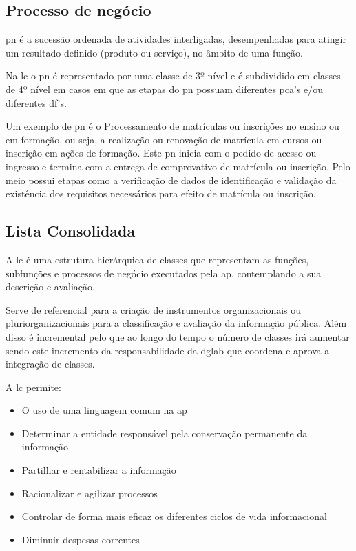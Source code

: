 \subsection{Processo de negócio}
\acrfull{pn} é a sucessão ordenada de atividades interligadas, desempenhadas para atingir um resultado definido (produto ou serviço), no âmbito de uma função.~\cite{procNeg}

Na \acrshort{lc} o \acrshort{pn} é representado por uma classe de 3º nível e é subdividido em classes de 4º nível em casos em que as etapas do \acrlong{pn} possuam diferentes \acrshort{pca}'s e/ou diferentes \acrshort{df}'s.

Um exemplo de \acrshort{pn} é o Processamento de matrículas ou inscrições no ensino ou em formação, ou seja, a realização ou renovação de matrícula em cursos ou inscrição em ações de formação. Este \acrshort{pn} inicia com o pedido de acesso ou ingresso e termina com a entrega de comprovativo de matrícula ou inscrição. Pelo meio possui etapas como a verificação de dados de identificação e validação da existência dos requisitos necessários para efeito de matrícula ou inscrição.

\subsection{Lista Consolidada}

A \acrfull{lc} é uma estrutura hierárquica de classes que representam as funções, subfunções e processos de negócio executados pela \acrfull{ap}, contemplando a sua descrição e avaliação.~\cite{lc}

Serve de referencial para a criação de instrumentos organizacionais ou pluriorganizacionais para a classificação e avaliação da informação pública. Além disso é incremental pelo que ao longo do tempo o número de classes irá aumentar sendo este incremento da responsabilidade da \acrshort{dglab} que coordena e aprova a integração de classes.

A \acrshort{lc} permite:~\cite{lc}
\begin{itemize}
    \item O uso de uma linguagem comum na \acrshort{ap}
    \item Determinar a entidade responsável pela conservação permanente da informação
    \item Partilhar e rentabilizar a informação
    \item Racionalizar e agilizar processos
    \item Controlar de forma mais eficaz os diferentes ciclos de vida informacional
    \item Diminuir despesas correntes
\end{itemize}

